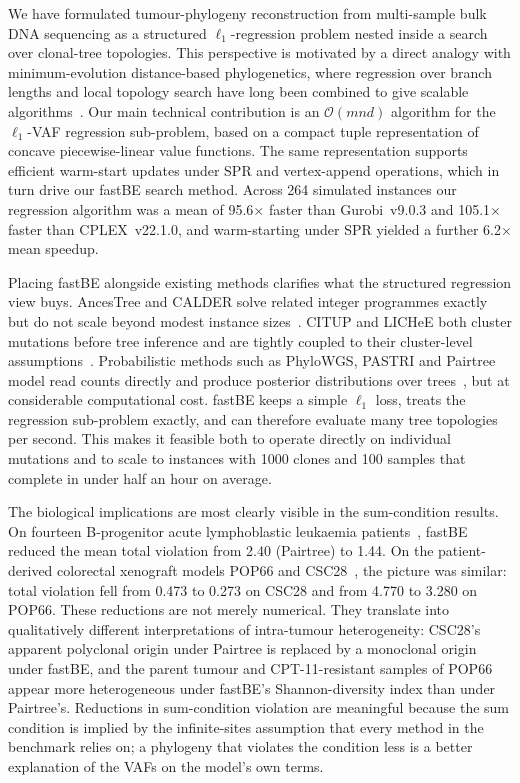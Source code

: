 \documentclass[11pt]{article}
\begin{document}
We have formulated tumour-phylogeny reconstruction from multi-sample bulk DNA sequencing as a structured $\ell_1$-regression problem nested inside a search over clonal-tree topologies. This perspective is motivated by a direct analogy with minimum-evolution distance-based phylogenetics, where regression over branch lengths and local topology search have long been combined to give scalable algorithms~\citep{desper2002fastme,lefort2015fastme,price2010fasttree}. Our main technical contribution is an $\mathcal{O}(mnd)$ algorithm for the $\ell_1$-VAF regression sub-problem, based on a compact tuple representation of concave piecewise-linear value functions. The same representation supports efficient warm-start updates under SPR and vertex-append operations, which in turn drive our fastBE search method. Across 264 simulated instances our regression algorithm was a mean of 95.6$\times$ faster than Gurobi~v9.0.3 and 105.1$\times$ faster than CPLEX~v22.1.0, and warm-starting under SPR yielded a further 6.2$\times$ mean speedup.

Placing fastBE alongside existing methods clarifies what the structured regression view buys. AncesTree and CALDER solve related integer programmes exactly but do not scale beyond modest instance sizes~\citep{elkebir2015reconstruction,myers2019calder}. CITUP and LICHeE both cluster mutations before tree inference and are tightly coupled to their cluster-level assumptions~\citep{malikic2015citup,popic2015lichee}. Probabilistic methods such as PhyloWGS, PASTRI and Pairtree model read counts directly and produce posterior distributions over trees~\citep{deshwar2015phylowgs,satas2017pastri,wintersinger2022pairtree}, but at considerable computational cost. fastBE keeps a simple $\ell_1$ loss, treats the regression sub-problem exactly, and can therefore evaluate many tree topologies per second. This makes it feasible both to operate directly on individual mutations and to scale to instances with 1000 clones and 100 samples that complete in under half an hour on average.

The biological implications are most clearly visible in the sum-condition results. On fourteen B-progenitor acute lymphoblastic leukaemia patients~\citep{wintersinger2022pairtree}, fastBE reduced the mean total violation from 2.40 (Pairtree) to 1.44. On the patient-derived colorectal xenograft models POP66 and CSC28~\citep{rehman2021diapause,ulintz2018polyclonal}, the picture was similar: total violation fell from 0.473 to 0.273 on CSC28 and from 4.770 to 3.280 on POP66. These reductions are not merely numerical. They translate into qualitatively different interpretations of intra-tumour heterogeneity: CSC28's apparent polyclonal origin under Pairtree is replaced by a monoclonal origin under fastBE, and the parent tumour and CPT-11-resistant samples of POP66 appear more heterogeneous under fastBE's Shannon-diversity index than under Pairtree's. Reductions in sum-condition violation are meaningful because the sum condition is implied by the infinite-sites assumption that every method in the benchmark relies on; a phylogeny that violates the condition less is a better explanation of the VAFs on the model's own terms.
\end{document}
